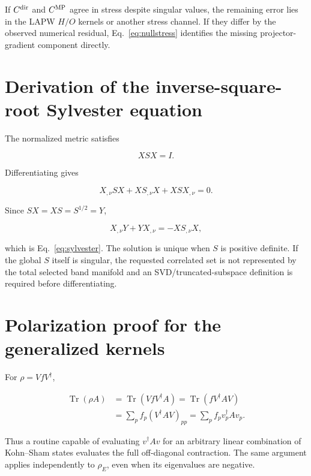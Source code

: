 \documentclass[11pt]{article}
\numberwithin{equation}{section}
\newcommand{\Tr}{\operatorname{Tr}}
\begin{document}
If $C^{\rm dir}$ and $C^{\rm MP}$ agree in stress despite singular values,
the remaining error lies in the LAPW $H/O$ kernels or another stress channel.
If they differ by the observed numerical residual, Eq.~\eqref{eq:nullstress}
identifies the missing projector-gradient component directly.

\clearpage
\appendix

\section{Derivation of the inverse-square-root Sylvester equation}

The normalized metric satisfies

\begin{equation}
 XSX=I.
\end{equation}

Differentiating gives

\begin{equation}
 X_{,\nu}SX+XS_{,\nu}X+XSX_{,\nu}=0.
\end{equation}

Since $SX=XS=S^{1/2}=Y$,

\begin{equation}
 X_{,\nu}Y+YX_{,\nu}=-XS_{,\nu}X,
\end{equation}

which is Eq.~\eqref{eq:sylvester}.  The solution is unique when $S$ is
positive definite.  If the global $S$ itself is singular, the requested
correlated set is not represented by the total selected band manifold and an
SVD/truncated-subspace definition is required before differentiating.

\section{Polarization proof for the generalized kernels}

For $\rho=VfV^\dagger$,

\begin{align}
 \Tr(\rho A)
 &=\Tr(VfV^\dagger A)
 =\Tr(fV^\dagger AV)\\
 &=\sum_pf_p(V^\dagger AV)_{pp}
 =\sum_pf_pv_p^\dagger Av_p.
\end{align}

Thus a routine capable of evaluating $v^\dagger Av$ for an arbitrary linear
combination of Kohn--Sham states evaluates the full off-diagonal contraction.
The same argument applies independently to $\rho_E$, even when its eigenvalues
are negative.
\end{document}
